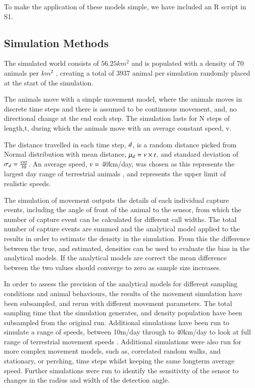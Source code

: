 \documentclass[a4paper,10pt,reqno,oneside]{amsart}
\begin{document}
To make the application of these models simple, we have included an R script in S1. 

\subsection{Simulation Methods}

The simulated world consists of $56.25km^2$ and is populated with a density of  70 animals per $km^2$ \citep{damuth1981population}, creating a total of 3937 animal per simulation randomly placed at the start of the simulation. 

The animals move with a simple movement model, where the animals moves in discrete time steps and there is assumed to be continuous movement, and, no directional change at the end each step. The simulation lasts for N steps of length,t, during which the animals move with an average constant speed, v. 

The distance travelled in each time step, $\mathnormal{d}$, is a random distance picked from Normal distribution with mean distance, $\mu_d = \mathnormal{v} \times \mathnormal{t}$,  and standard deviation of $\sigma_d = \frac{\mathnormal{v} \times \mathnormal{t}}{10}$. An average speed, $\mathnormal{v} = $ 40km/day, was chosen as this represents the largest day range of terrestrial animals \citep{carbone2005far}, and represents the upper limit of realistic speeds.
  
The simulation of movement outputs the details of each individual capture events, including the angle of front of the animal to the sensor, from which the number of capture event can be calculated for different call widths. The total number of capture events are summed and the analytical model applied to the results in order to estimate the density in the simulation. From this the difference between the true, and estimated, densities can be used to evaluate the bias in the analytical models. If the analytical models are correct the mean difference between the two values should converge to zero as sample size increases. 

In order to assess the precision of the analytical models for different sampling conditions and animal behaviours, the results of the movement simulation have been subsampled, and rerun with different movement parameters. The total sampling time that the simulation generates, and density population have been subsampled from the original run. Additional simulations have been run to simulate a range of speeds, between 10m/day through to 40km/day to look at full range of terrestrial movement speeds \citep{carbone2005far}. Additional simulations were also run for more complex movement models, such as, correlated random walks, and stationary, or perching, time steps whilst keeping the same longterm average speed. Further simulations were run to identify the sensitivity of the sensor to changes in the radius and width of the detection angle.
\end{document}
